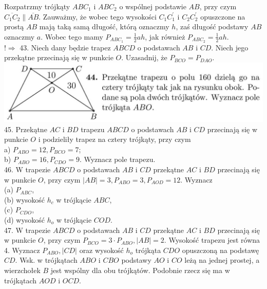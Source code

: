 \documentclass[10pt]{article}
\begin{document}
Rozpatrzmy trójkąty \(A B C_{1}\) i \(A B C_{2}\) o wspólnej podstawie \(A B\), przy czym \(\overline{C_{1} C_{2}} \| \overline{A B}\). Zauważmy, że wobec tego wysokości \(C_{1} C_{1}^{\prime}\) i \(C_{2} C_{2}^{\prime}\) opuszczone na prostą \(A B\) mają taką samą długość, którą oznaczmy \(h\), zaś długość podstawy \(A B\) oznaczmy \(a\). Wobec tego mamy \(P_{A B C_{1}}=\frac{1}{2} a h\), jak również \(P_{A B C_{2}}=\frac{1}{2} a h\).\\
\(!\Rightarrow\) 43. Niech dany będzie trapez \(A B C D\) o podstawach \(A B\) i \(C D\). Niech jego przekątne przecinają się w punkcie \(O\). Uzasadnij, że \(P_{B C O}=P_{D A O}\).\\
\includegraphics[max width=\textwidth, center]{2024_11_21_71f62bd117d375398909g-041(1)}\\
45. Przekątne \(A C\) i \(B D\) trapezu \(A B C D\) o podstawach \(A B\) i \(C D\) przecinają się w punkcie \(O\) i podzieliły trapez na cztery trójkąty, przy czym\\
a) \(P_{A B O}=12, P_{B C O}=7\);\\
b) \(P_{A B O}=16, P_{C D O}=9\). Wyznacz pole trapezu.\\
46. W trapezie \(A B C D\) o podstawach \(A B\) i \(C D\) przekątne \(A C\) i \(B D\) przecinają się w punkcie \(O\), przy czym \(|A B|=3, P_{A B O}=3, P_{A O D}=12\). Wyznacz\\
(a) \(P_{A B C}\),\\
(b) wysokość \(h_{c}\) w trójkącie \(A B C\),\\
(c) \(P_{C D O}\),\\
(d) wysokość \(h_{o}\) w trójkącie \(C O D\).\\
47. W trapezie \(A B C D\) o podstawach \(A B\) i \(C D\) przekątne \(A C\) i \(B D\) przecinają się w punkcie \(O\), przy czym \(P_{B C O}=3 \cdot P_{A B O},|A B|=2\). Wysokość trapezu jest równa 4. Wyznacz \(P_{A B O},|C D|\) oraz wysokość \(h_{o}\) trójkąta \(C D O\) opuszczoną na podstawę \(C D\). Wsk. w trójkątach \(A B O\) i \(C B O\) podstawy \(A O\) i \(C O\) leżą na jednej prostej, a wierzchołek \(B\) jest wspólny dla obu trójkątów. Podobnie rzecz się ma w trójkątach \(A O D\) i \(O C D\).\\
\end{document}
